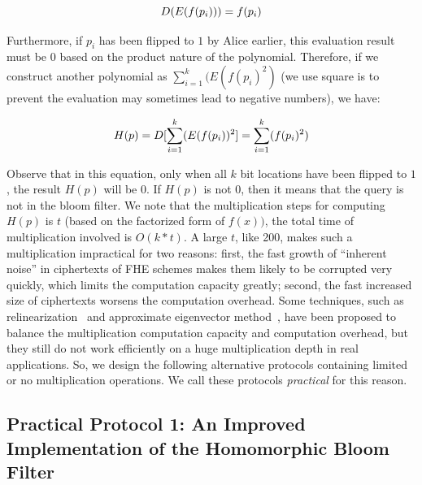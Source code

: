 \begin{equation}
\vspace{-0.1in}
D(E(f(p_i))) = f(p_i)
\end{equation}

Furthermore, if $p_i$ has been flipped to $1$ by Alice earlier, this evaluation result must be $0$ based on the product nature of the polynomial. Therefore, if we construct another polynomial as $\sum_{i=1}^{k}(E(f(p_i)^2)$ (we use square is to prevent the evaluation may sometimes lead to negative numbers), we have:

\begin{equation}
\vspace{-0.1in}
H(p) = D[\sum_{i=1}^{k}(E(f(p_i))^2] = \sum_{i=1}^{k}(f(p_i)^2)
\end{equation}

Observe that in this equation, only when all $k$ bit locations have been flipped to $1$, the result $H(p)$ will be $0$. If $H(p)$ is not $0$, then it means that the query is not in the bloom filter. We note that the multiplication steps for computing $H(p)$ is $t$ (based on the factorized form of $f(x))$, the total time of multiplication involved is $O(k*t)$. A large $t$, like 200, makes such a multiplication impractical for two reasons: first, the fast growth of ``inherent noise'' in ciphertexts of FHE schemes makes them likely to be corrupted very quickly, which limits the computation capacity greatly; second, the fast increased size of ciphertexts worsens the computation overhead. Some techniques, such as relinearization~\cite{brakerski2012leveled} and approximate eigenvector method~\cite{gentry2013homomorphic}, have been proposed to balance the multiplication computation capacity and computation overhead, but they still do not work efficiently on a huge multiplication depth in real applications. So, we design the following alternative protocols containing limited or no multiplication operations. We call these protocols \emph{practical} for this reason.




\subsection{Practical Protocol 1: An Improved Implementation of the Homomorphic Bloom Filter}
\label{subsec:basic_implementation}

